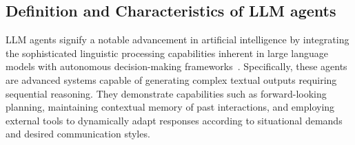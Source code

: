 \documentclass[10pt,preprint]{article}
\begin{document}
\subsection{Definition and Characteristics of LLM agents}

LLM agents signify a notable advancement in artificial intelligence by integrating the sophisticated linguistic processing capabilities inherent in large language models with autonomous decision-making frameworks~\citep{yao2022react,autogpt,hong2024metagpt}. Specifically, these agents are advanced systems capable of generating complex textual outputs requiring sequential reasoning. They demonstrate capabilities such as forward-looking planning, maintaining contextual memory of past interactions, and employing external tools to dynamically adapt responses according to situational demands and desired communication styles.
\end{document}
